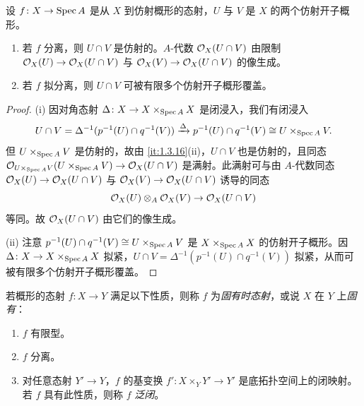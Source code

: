 \begin{proposition}\label{it:1.3.25}
设 $f\colon X\to \operatorname{Spec} A$ 是从 $X$ 到仿射概形的态射，$U$ 与 $V$ 是 $X$ 的两个仿射开子概形。
\begin{enumerate}[label=(\roman*),leftmargin=2.8em]
  \item 若 $f$ 分离，则 $U\cap V$ 是仿射的。$A$-代数 $\mathcal{O}_X(U\cap V)$ 由限制 $\mathcal{O}_X(U)\to \mathcal{O}_X(U\cap V)$ 与 $\mathcal{O}_X(V)\to \mathcal{O}_X(U\cap V)$ 的像生成。
  \item 若 $f$ 拟分离，则 $U\cap V$ 可被有限多个仿射开子概形覆盖。
\end{enumerate}
\end{proposition}

\begin{proof}
(i) 因对角态射 $\Delta\colon X\to X\times_{\operatorname{Spec} A}X$ 是闭浸入，我们有闭浸入
\[
U\cap V=\Delta^{-1}(p^{-1}(U)\cap q^{-1}(V))\xrightarrow{\Delta}p^{-1}(U)\cap q^{-1}(V)\cong U\times_{\operatorname{Spec} A}V.
\]
但 $U\times_{\operatorname{Spec} A}V$ 是仿射的，故由 \ref{it:1.3.16}(ii)，$U\cap V$ 也是仿射的，且同态 $\mathcal{O}_{U\times_{\operatorname{Spec} A}V}(U\times_{\operatorname{Spec} A}V)\to \mathcal{O}_X(U\cap V)$ 是满射。此满射可与由 $A$-代数同态 $\mathcal{O}_X(U)\to \mathcal{O}_X(U\cap V)$ 与 $\mathcal{O}_X(V)\to \mathcal{O}_X(U\cap V)$ 诱导的同态
\[
\mathcal{O}_X(U)\otimes_A \mathcal{O}_X(V)\to \mathcal{O}_X(U\cap V)
\]
等同。故 $\mathcal{O}_X(U\cap V)$ 由它们的像生成。

(ii) 注意 $p^{-1}(U)\cap q^{-1}(V)\cong U\times_{\operatorname{Spec} A}V$ 是 $X\times_{\operatorname{Spec} A}X$ 的仿射开子概形。因 $\Delta\colon X\to X\times_{\operatorname{Spec} A}X$ 拟紧，$U\cap V=\Delta^{-1}(p^{-1}(U)\cap q^{-1}(V))$ 拟紧，从而可被有限多个仿射开子概形覆盖。
\end{proof}

若概形的态射 $f\colon X\to Y$ 满足以下性质，则称 $f$ 为\emph{固有时态射}，或说 $X$ 在 $Y$ 上\emph{固有}：
\begin{enumerate}[label=(\roman*),leftmargin=2.8em]
  \item $f$ 有限型。
  \item $f$ 分离。
  \item 对任意态射 $Y'\to Y$，$f$ 的基变换 $f'\colon X\times_Y Y'\to Y'$ 是底拓扑空间上的闭映射。若 $f$ 具有此性质，则称 $f$ \emph{泛闭}。
\end{enumerate}

